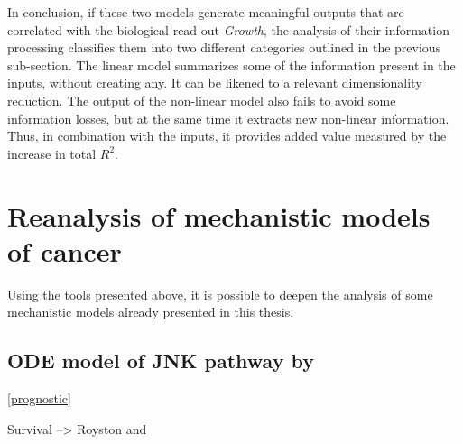 \documentclass[a4paper,12pt,twoside,onecolumn,openright,final,oldfontcommands]{memoir}
\begin{document}
In conclusion, if these two models generate meaningful outputs that are
correlated with the biological read-out \emph{Growth}, the analysis of
their information processing classifies them into two different
categories outlined in the previous sub-section. The linear model
summarizes some of the information present in the inputs, without
creating any. It can be likened to a relevant dimensionality reduction.
The output of the non-linear model also fails to avoid some information
losses, but at the same time it extracts new non-linear information.
Thus, in combination with the inputs, it provides added value measured
by the increase in total \(R^2\).

\section{Reanalysis of mechanistic models of
cancer}\label{reanalysis-of-mechanistic-models-of-cancer}

Using the tools presented above, it is possible to deepen the analysis
of some mechanistic models already presented in this thesis.

\subsection{\texorpdfstring{ODE model of JNK pathway by
\citet{fey2015signaling}}{ODE model of JNK pathway by @fey2015signaling}}\label{ode-model-of-jnk-pathway-by-fey2015signaling}

\ref{prognostic}

Survival --\textgreater{} Royston and \citep{choodari2012simulation}
\end{document}
